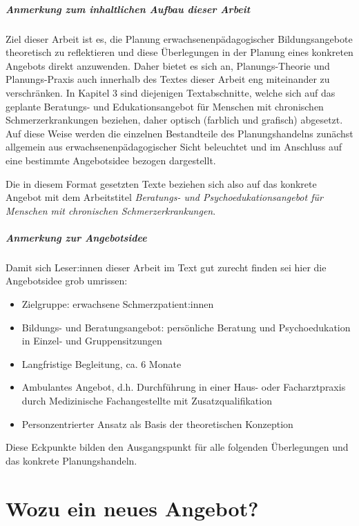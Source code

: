 \documentclass[
  twoside,
  parskip=half-,
  paper=176mm:246mm,
  BCOR=14mm,
  DIV=14,
]{scrreprt}
\begin{document}
\paragraph{Anmerkung zum inhaltlichen Aufbau dieser Arbeit} Ziel dieser Arbeit ist es, die Planung erwachsenenpädagogischer Bildungsangebote theoretisch zu reflektieren und diese Überlegungen in der Planung eines konkreten Angebots direkt anzuwenden. Daher bietet es sich an, Planungs-Theorie und Planungs-Praxis auch innerhalb des Textes dieser Arbeit eng miteinander zu verschränken. In Kapitel 3 sind diejenigen Textabschnitte, welche sich auf das geplante Beratungs- und Edukationsangebot für Menschen mit chronischen Schmerzerkrankungen beziehen, daher optisch (farblich und grafisch) abgesetzt. Auf diese Weise werden die einzelnen Bestandteile des Planungshandelns zunächst allgemein aus erwachsenenpädagogischer Sicht beleuchtet und im Anschluss auf eine bestimmte Angebotsidee bezogen dargestellt.
\begin{praxis}
  Die in diesem Format gesetzten Texte beziehen sich also auf das konkrete Angebot mit dem Arbeitstitel \textit{Beratungs- und Psychoedukationsangebot für Menschen mit chronischen Schmerzerkrankungen}.
\end{praxis}

\paragraph{Anmerkung zur Angebotsidee}

Damit sich Leser:innen dieser Arbeit im Text gut zurecht finden sei hier die Angebotsidee grob umrissen:
\begin{itemize}
  \item Zielgruppe: erwachsene Schmerzpatient:innen
  \item Bildungs- und Beratungsangebot: persönliche Beratung und Psychoedukation in Einzel- und Gruppensitzungen 
  \item Langfristige Begleitung, ca. 6 Monate
  \item Ambulantes Angebot, d.h. Durchführung in einer Haus- oder Facharztpraxis durch Medizinische Fachangestellte mit Zusatzqualifikation
  \item Personzentrierter Ansatz als Basis der theoretischen Konzeption
\end{itemize}

Diese Eckpunkte bilden den Ausgangspunkt für alle folgenden Überlegungen und das konkrete Planungshandeln.


\chapter{Wozu ein neues Angebot?}
\end{document}
